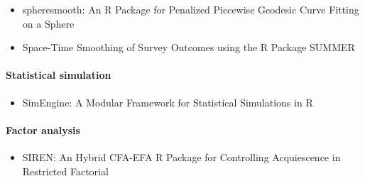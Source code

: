 \begin{itemize}
\tightlist
\item
  spheresmooth: An R Package for Penalized Piecewise Geodesic Curve Fitting on a Sphere
\item
  Space-Time Smoothing of Survey Outcomes using the R Package SUMMER
\end{itemize}

\paragraph{Statistical simulation}\label{statistical-simulation}

\begin{itemize}
\tightlist
\item
  SimEngine: A Modular Framework for Statistical Simulations in R
\end{itemize}

\paragraph{Factor analysis}\label{factor-analysis}

\begin{itemize}
\tightlist
\item
  SIREN: An Hybrid CFA-EFA R Package for Controlling Acquiescence in Restricted Factorial
\end{itemize}


\address{%
Rob J Hyndman\\
Monash University\\%
\\
%
\url{https://journal.r-project.org}\\%
%
\href{mailto:r-journal@r-project.org}{\nolinkurl{r-journal@r-project.org}}%
}
